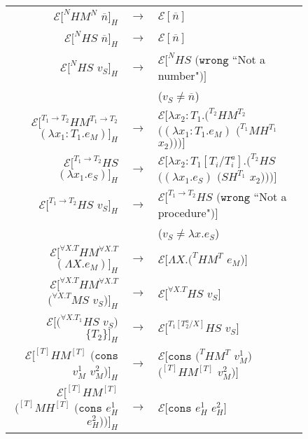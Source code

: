 \begin{figure}
\onehalfspacing
\begin{center}
\begin{tabular}{rcl}
$\mathscr{E}[^{N}HM^{N}$ $\overline{n}]_{H}$ & $\rightarrow$ & $\mathscr{E}[\overline{n}]$ \\
$\mathscr{E}[^{N}HS$ $\overline{n}]_{H}$ & $\rightarrow$ & $\mathscr{E}[\overline{n}]$ \\
$\mathscr{E}[^{N}HS$ $v_{S}]_{H}$ & $\rightarrow$ & $\mathscr{E}[^{N}HS$ $(\mathtt{wrong}$ ``Not a number"$)]$ \\
&& ($v_{S}\neq\overline{n}$) \\
$\mathscr{E}[^{T_{1}\rightarrow T_{2}}HM^{T_{1}\rightarrow T_{2}}$ $(\lambda x_{1}:T_{1}.e_{M})]_{H}$ & $\rightarrow$ & $\mathscr{E}[\lambda x_{2}:T_{1}.(^{T_{2}}HM^{T_{2}}$ $((\lambda x_{1}:T_{1}.e_{M})$ $(^{T_{1}}MH^{T_{1}}$ $x_{2})))]$ \\
$\mathscr{E}[^{T_{1}\rightarrow T_{2}}HS$ $(\lambda x_{1}.e_{S})]_{H}$ & $\rightarrow$ & $\mathscr{E}[\lambda x_{2}:T_{1}[T_{i}/T^{a}_{i}].(^{T_{2}}HS$ $((\lambda x_{1}.e_{S})$ $(SH^{T_{1}}$ $x_{2})))]$ \\
$\mathscr{E}[^{T_{1}\rightarrow T_{2}}HS$ $v_{S}]_{H}$ & $\rightarrow$ & $\mathscr{E}[^{T_{1}\rightarrow T_{2}}HS$ $(\mathtt{wrong}$ ``Not a procedure"$)]$ \\
&& ($v_{S}\neq\lambda x.e_{S}$) \\
$\mathscr{E}[^{\forall X.T}HM^{\forall X.T}$ $(\Lambda X.e_{M})]_{H}$ & $\rightarrow$ & $\mathscr{E}[\Lambda X.(^{T}HM^{T}$ $e_{M})]$ \\
$\mathscr{E}[^{\forall X.T}HM^{\forall X.T}$ $(^{\forall X.T}MS$ $v_{S})]_{H}$ & $\rightarrow$ & $\mathscr{E}[^{\forall X.T}HS$ $v_{S}]$ \\
$\mathscr{E}[(^{\forall X.T_{1}}HS$ $v_{S})$ $\lbrace T_{2}\rbrace]_{H}$ & $\rightarrow$ & $\mathscr{E}[^{T_{1}[T^{a}_{2}/X]}HS$ $v_{S}]$ \\
$\mathscr{E}[^{[T]}HM^{[T]}$ $(\mathtt{cons}$ $v_{M}^{1}$ $v_{M}^{2})]_{H}$ & $\rightarrow$ & $\mathscr{E}[\mathtt{cons}$ $(^{T}HM^{T}$ $v_{M}^{1})$ $(^{[T]}HM^{[T]}$ $v_{M}^{2})]$ \\
$\mathscr{E}[^{[T]}HM^{[T]}$ $(^{[T]}MH^{[T]}$ $(\mathtt{cons}$ $e_{H}^{1}$ $e_{H}^{2}))]_{H}$ & $\rightarrow$ & $\mathscr{E}[\mathtt{cons}$ $e_{H}^{1}$ $e_{H}^{2}]$ \\

\end{tabular}
\end{center}
\end{figure}
